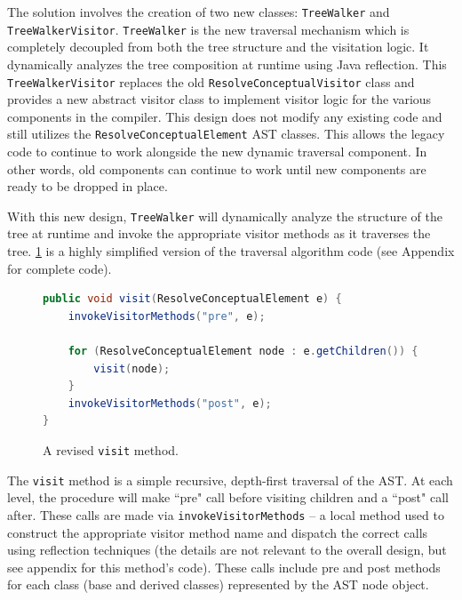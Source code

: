 \documentclass[times]{speauth}
\begin{document}
The solution involves the creation of two new classes: \texttt{TreeWalker} and \texttt{TreeWalkerVisitor}. \texttt{TreeWalker} is the new traversal mechanism which is completely decoupled from both the tree structure and the visitation logic. It dynamically analyzes the tree composition at runtime using Java reflection. This \texttt{TreeWalkerVisitor} replaces the old \texttt{ResolveConceptualVisitor} class and provides a new abstract visitor class to implement visitor logic for the various components in the compiler. This design does not modify any existing code and still utilizes the \texttt{ResolveConceptualElement} AST classes. This allows the legacy code to continue to work alongside the new dynamic traversal component. In other words, old components can continue to work until new components are ready to be dropped in place.

With this new design, \texttt{TreeWalker} will dynamically analyze the structure of the tree at runtime and invoke the appropriate visitor methods as it traverses the tree. \ref{fig:newvisit} is a highly simplified version of the traversal algorithm code (see Appendix for complete code).

\begin{figure}[!htb]
\centering
\begin{minipage}{.80\textwidth}
\begin{lstlisting}[language=java]
public void visit(ResolveConceptualElement e) {
    invokeVisitorMethods("pre", e);

    for (ResolveConceptualElement node : e.getChildren()) {
        visit(node);
    }
    invokeVisitorMethods("post", e);
}
\end{lstlisting}
\end{minipage}
\caption{A revised \texttt{visit} method.}
\label{fig:newvisit}
\end{figure}

The \texttt{visit} method is a simple recursive, depth-first traversal of the AST. At each level, the procedure will make ``pre" call before visiting children and a ``post" call after. These calls are made via \texttt{invokeVisitorMethods} -- a local method used to construct the appropriate visitor method name and dispatch the correct calls using reflection techniques (the details are not relevant to the overall design, but see appendix for this method's code). These calls include pre and post methods for each class (base and derived classes) represented by the AST node object.
\end{document}
